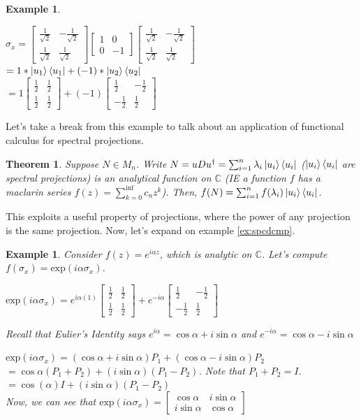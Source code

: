 \documentclass[12pt]{article}
\theoremstyle{plain}
\newtheorem{theorem}[lemma]{Theorem}
\theoremstyle{nonumberplain}
\theoremstyle{plain}
\newtheorem{example}[lemma]{Example}
\theoremstyle{nonumberplain}
\newcommand\1{{\bf 1}}
\newcommand{\bmat}[1]{\begin{bmatrix*} #1 \end{bmatrix*}} %
\newcommand{\C}{\mathbb{C}} %
\newcommand{\<}{\left\langle}
\renewcommand{\>}{\right\rangle}
\begin{document}
\begin{example}
\begin{center}
$\sigma_x=\bmat{\frac{1}{\sqrt{2}} & -\frac{1}{\sqrt{2}} \\ \frac{1}{\sqrt{2}} & \frac{1}{\sqrt{2}}}\bmat{1 & 0 \\ 0 & -1}\bmat{\frac{1}{\sqrt{2}} & -\frac{1}{\sqrt{2}} \\ \frac{1}{\sqrt{2}} & \frac{1}{\sqrt{2}}}$ \\ $=1*\ket{u_1}\bra{u_1}+(-1)*\ket{u_2}\bra{u_2}$ \\
$=1\bmat{\frac{1}{2} & \frac{1}{2} \\ \frac{1}{2} & \frac{1}{2}}+(-1)\bmat{\frac{1}{2} & -\frac{1}{2} \\ -\frac{1}{2} & \frac{1}{2}}$
\end{center}
\end{example}
Let's take a break from this example to talk about an application of functional calculus for spectral projections.
\begin{theorem}
Suppose $N\in M_n$. Write $N=uDu^\dagger=\sum^{n}_{i=1}\lambda_i\ket{u_i}\bra{u_i}$ ($\ket{u_i}\bra{u_i}$ are spectral projections) is an analytical function on $\C$ (IE a function $f$ has a maclarin series $f(z)=\sum^{\inf}_{k=0}{c_n}z^k$). Then, $f(N)=\sum^n_{i=1}f(\lambda_i)\ket{u_i}\bra{u_i}$.
\end{theorem}
This exploits a useful property of projections, where the power of any projection is the same projection. Now, let's expand on example \ref{ex:spcdcmp}.
\begin{example}
Consider $f(z)=e^{i\alpha z}$, which is analytic on $\C$. Let's compute $f(\sigma_x)=\text{exp}(i\alpha \sigma_x)$.
\begin{center}
$\text{exp}(i\alpha \sigma_x)=e^{i\alpha(1)}\bmat{\frac{1}{2} & \frac{1}{2} \\ \frac{1}{2} & \frac{1}{2}}+e^{-i\alpha}\bmat{\frac{1}{2} & -\frac{1}{2} \\ -\frac{1}{2} & \frac{1}{2}}$
\end{center}
Recall that Eulier's Identity says $e^{i\alpha}=\cos{\alpha}+i\sin{\alpha}$ and $e^{-i\alpha}=\cos{\alpha}-i\sin{\alpha}$
\begin{center}
$\text{exp}(i\alpha \sigma_x)=(\cos{\alpha}+i\sin{\alpha})P_1+(\cos{\alpha}-i\sin{\alpha})P_2$ \\
$=\cos{\alpha}(P_1+P_2)+(i\sin{\alpha})(P_1-P_2)$. Note that $P_1+P_2=I$. \\
$=\cos({\alpha})I+(i\sin{\alpha})(P_1-P_2)$ \\
Now, we can see that $\text{exp}(i\alpha \sigma_x)=\bmat{\cos{\alpha} & i\sin{\alpha} \\ i\sin{\alpha} & \cos{\alpha}}$
\end{center}
\end{example}
\end{document}
